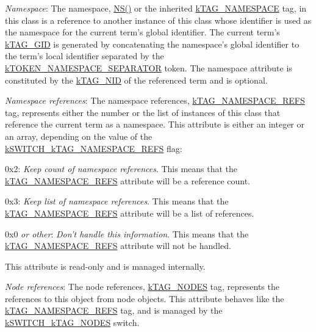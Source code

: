 {\itshape 
\begin{DoxyItemize}
\item {\itshape Namespace}\-: The namespace, {\ttfamily \hyperlink{}{N\-S()}} or the inherited {\ttfamily \hyperlink{}{k\-T\-A\-G\-\_\-\-N\-A\-M\-E\-S\-P\-A\-C\-E}} tag, in this class is a reference to another instance of this class whose identifier is used as the namespace for the current term's global identifier. The current term's \hyperlink{}{k\-T\-A\-G\-\_\-\-G\-I\-D} is generated by concatenating the namespace's global identifier to the term's local identifier separated by the \hyperlink{}{k\-T\-O\-K\-E\-N\-\_\-\-N\-A\-M\-E\-S\-P\-A\-C\-E\-\_\-\-S\-E\-P\-A\-R\-A\-T\-O\-R} token. The namespace attribute is constituted by the \hyperlink{}{k\-T\-A\-G\-\_\-\-N\-I\-D} of the referenced term and is optional. 
\item {\itshape Namespace references}\-: The namespace references, {\ttfamily \hyperlink{}{k\-T\-A\-G\-\_\-\-N\-A\-M\-E\-S\-P\-A\-C\-E\-\_\-\-R\-E\-F\-S}} tag, represents either the number or the list of instances of this class that reference the current term as a namespace. This attribute is either an integer or an array, depending on the value of the \hyperlink{}{k\-S\-W\-I\-T\-C\-H\-\_\-k\-T\-A\-G\-\_\-\-N\-A\-M\-E\-S\-P\-A\-C\-E\-\_\-\-R\-E\-F\-S} flag\-: 
\begin{DoxyItemize}
\item {\ttfamily 0x2}\-: {\itshape Keep count of namespace references}. This means that the \hyperlink{}{k\-T\-A\-G\-\_\-\-N\-A\-M\-E\-S\-P\-A\-C\-E\-\_\-\-R\-E\-F\-S} attribute will be a reference count. 
\item {\ttfamily 0x3}\-: {\itshape Keep list of namespace references}. This means that the \hyperlink{}{k\-T\-A\-G\-\_\-\-N\-A\-M\-E\-S\-P\-A\-C\-E\-\_\-\-R\-E\-F\-S} attribute will be a list of references. 
\item {\ttfamily 0x0} {\itshape or other}\-: {\itshape Don't handle this information}. This means that the \hyperlink{}{k\-T\-A\-G\-\_\-\-N\-A\-M\-E\-S\-P\-A\-C\-E\-\_\-\-R\-E\-F\-S} attribute will not be handled. 
\end{DoxyItemize}This attribute is read-\/only and is managed internally. 
\item {\itshape Node references}\-: The node references, {\ttfamily \hyperlink{}{k\-T\-A\-G\-\_\-\-N\-O\-D\-E\-S}} tag, represents the references to this object from node objects. This attribute behaves like the {\ttfamily \hyperlink{}{k\-T\-A\-G\-\_\-\-N\-A\-M\-E\-S\-P\-A\-C\-E\-\_\-\-R\-E\-F\-S}} tag, and is managed by the \hyperlink{}{k\-S\-W\-I\-T\-C\-H\-\_\-k\-T\-A\-G\-\_\-\-N\-O\-D\-E\-S} switch. 

\end{DoxyItemize}}
